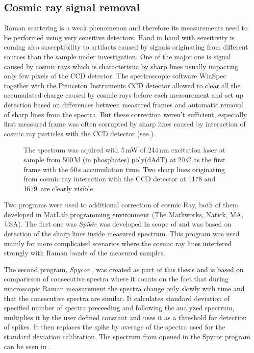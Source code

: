 \subsection{Cosmic ray signal removal}

Raman scattering is a weak phenomenon and therefore its measurements need to be
performed using very sensitive detectors.
Hand in hand with sensitivity is coming also susceptibility to artifacts caused
by signals originating from different sources than the sample under
investigation.
One of the major one is signal caused by cosmic rays which is characteristic
by sharp lines usually impacting only few pixels of the CCD detector.
The spectroscopic software WinSpec together with the Princeton Instruments
CCD detector allowed to clear all the accumulated charge caused by cosmic rays
before each measurement and set up detection based on differences between
measured frames and automatic removal of sharp lines from the spectra.
But these correction weren't sufficient, especially first measured frame
was often corrupted by sharp lines caused by interaction of cosmic ray
particles with the CCD detector
(see ).

\begin{figure}
	\centering
	
	\vspace{3mm}
	\caption[%
		UVRR pectrum containing cosmic ray signal.
	]{%
		The spectrum was aquired with 5\,mW of 244\,nm excitation laser at sample
		from 500\,M (in phosphates) poly(dAdT) at 20\,\textdegree{}C as the
		first frame with the 60\,s accumulation time.
		Two sharp lines originating from cosmic ray interaction with the CCD
		detector at 1178 and 1679\,\icm{} are clearly visible.
	}
	\label{\figlabel{cosmic_spikes:spectrum}}
\end{figure}

Two programs were used to additional correction of cosmic Ray, both of them
developed in MatLab programming environment (The Mathworks, Natick, MA, USA).
The first one was \emph{Spikie}
\parencite{Spikie2011}
was developed in scope of
\textcite{Klener2011}
and was based on detection of the sharp lines inside measured spectrum.
This program was used mainly for more complicated scenarios where the cosmic
ray lines interfered strongly with Raman bands of the measured samples.

The second program, \emph{Spycor}
\parencite{Spycor2018},
was created as part of this thesis and is based on comparisson of consecutive
spectra where it counts on the fact that during macroscopic Raman measurement
the spectra change only slowly with time and that the consecutive spectra are
similar.
It calculates standard deviation of specified number of spectra preceeding and
following the analyzed spectrum, multiplies it by the user defined constant
and uses it as a threshold for detection of spikes.
It then replaces the spike by average of the spectra used for the standard
deviation calibration. The spectrum from
opened in the Spycor program can be seen in
.


